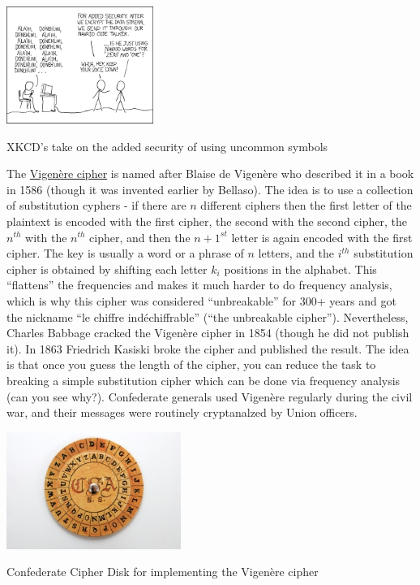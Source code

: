 \begin{marginfigure}
\centering
\includegraphics[width=\linewidth, height=1.5in, keepaspectratio]{../figure/code_talkers.png}
\caption{XKCD's take on the added security of using uncommon symbols}
\label{XKCDnavajofig}
\end{marginfigure}

The \href{https://en.wikipedia.org/wiki/Vigen\%C3\%A8re_cipher}{Vigenère
cipher} is named after Blaise de Vigenère who described it in a book in
1586 (though it was invented earlier by Bellaso). The idea is to use a
collection of substitution cyphers - if there are \(n\) different
ciphers then the first letter of the plaintext is encoded with the first
cipher, the second with the second cipher, the \(n^{th}\) with the
\(n^{th}\) cipher, and then the \(n+1^{st}\) letter is again encoded
with the first cipher. The key is usually a word or a phrase of \(n\)
letters, and the \(i^{th}\) substitution cipher is obtained by shifting
each letter \(k_i\) positions in the alphabet. This ``flattens'' the
frequencies and makes it much harder to do frequency analysis, which is
why this cipher was considered ``unbreakable'' for 300+ years and got
the nickname ``le chiffre indéchiffrable'' (``the unbreakable cipher'').
Nevertheless, Charles Babbage cracked the Vigenère cipher in 1854
(though he did not publish it). In 1863 Friedrich Kasiski broke the
cipher and published the result. The idea is that once you guess the
length of the cipher, you can reduce the task to breaking a simple
substitution cipher which can be done via frequency analysis (can you
see why?). Confederate generals used Vigenère regularly during the civil
war, and their messages were routinely cryptanalzed by Union officers.

\begin{marginfigure}
\centering
\includegraphics[width=\linewidth, height=1.5in, keepaspectratio]{../figure/confederate_cipher_disk.jpg}
\caption{Confederate Cipher Disk for implementing the Vigenère cipher}
\label{tmplabelfig}
\end{marginfigure}

